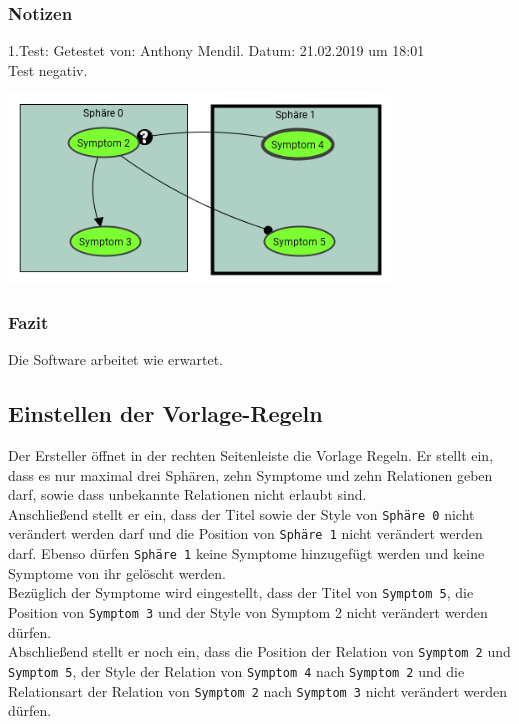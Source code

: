 \documentclass{scrartcl}
\newcommand{\subsectiont}[2]{\subsection[#1]{#1{\normalsize\normalfont #2}}}
\begin{document}
\subsubsection{Notizen}
1.Test: Getestet von: Anthony Mendil. Datum: 21.02.2019 um 18:01 \\
Test negativ.
\begin{center}
\includegraphics[height=5cm]{1_11.PNG}
\end{center}
\subsubsection{Fazit}
Die Software arbeitet wie erwartet.

\subsectiont{Einstellen der Vorlage-Regeln}{\dotfill}
Der Ersteller öffnet in der rechten Seitenleiste die Vorlage Regeln. Er stellt ein, dass es nur maximal drei Sphären, zehn Symptome und zehn Relationen geben darf, sowie dass unbekannte Relationen nicht erlaubt sind. \\
Anschließend stellt er ein, dass der Titel sowie der Style von \texttt{Sphäre 0} nicht verändert werden darf und die Position von \texttt{Sphäre 1} nicht verändert werden darf. Ebenso dürfen \texttt{Sphäre 1} keine Symptome hinzugefügt werden und keine Symptome von ihr gelöscht werden.  \\
Bezüglich der Symptome wird eingestellt, dass der Titel von \texttt{Symptom 5}, die Position von \texttt{Symptom 3} und der Style von {Symptom 2} nicht verändert werden dürfen. \\
Abschließend stellt er noch ein, dass die Position der Relation von \texttt{Symptom 2} und \texttt{Symptom 5}, der Style der Relation von \texttt{Symptom 4} nach \texttt{Symptom 2} und die Relationsart der Relation von \texttt{Symptom 2} nach \texttt{Symptom 3} nicht verändert werden dürfen. 
\end{document}
